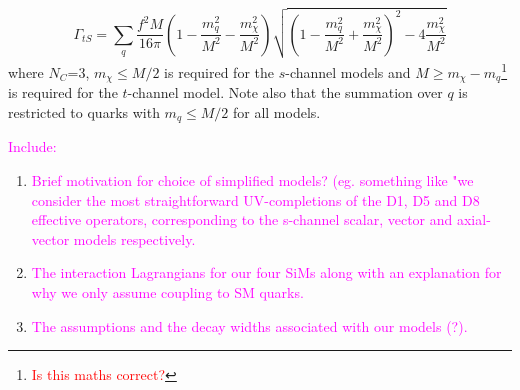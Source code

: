 \begin{flushleft}
\begin{equation}
\end{equation}
\begin{equation}
\label{gamma_tS}
\Gamma_{tS} = \sum_{\substack{q}} \frac{f^{2}M}{16\pi}\left(1 - \frac{m_{q}^{2}}{M^{2}} - \frac{m_{\chi}^{2}}{M^{2}}\right)\sqrt{\left(1 - \frac{m_{q}^{2}}{M^{2}} + \frac{m_{\chi}^{2}}{M^{2}}\right)^{2} - 4\frac{m_{\chi}^{2}}{M^{2}}}
\end{equation}
where $N_{C}$=3, $m_{\chi} \leq M/2$ is required for the $s$-channel models and $M \geq m_{\chi} - m_{q}$\footnote{\textcolor{red}{Is this maths correct?}} is required for the $t$-channel model. Note also that the summation over $q$ is restricted to quarks with $m_{q} \leq M/2$ for all models.

\textcolor{magenta}{Include:}
\begin{enumerate}
\item \textcolor{magenta}{Brief motivation for choice of simplified models? (eg. something like "we consider the most straightforward UV-completions of the D1, D5 and D8 effective operators, corresponding to the s-channel scalar, vector and axial-vector models respectively.}
\item \textcolor{magenta}{The interaction Lagrangians for our four SiMs along with an explanation for why we only assume coupling to SM quarks.}
\item \textcolor{magenta}{The assumptions and the decay widths associated with our models (?).}
\end{enumerate}
\end{flushleft}


